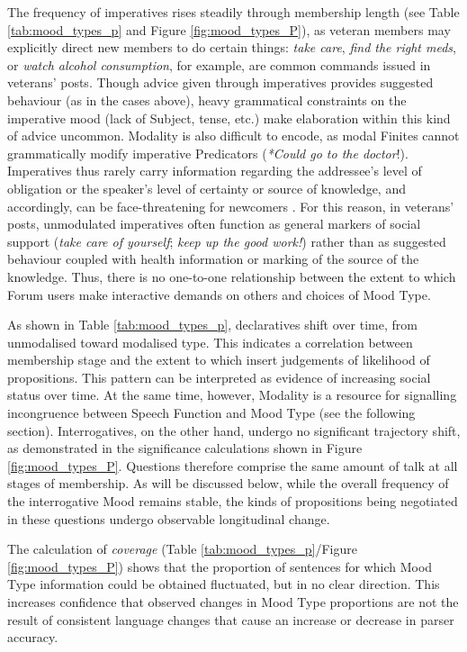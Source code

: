 The frequency of imperatives rises steadily through membership length (see Table \ref{tab:mood_types_p} and Figure \ref{fig:mood_types_P}), as veteran \glspl{member} may explicitly direct new \glspl{member} to do certain things: \emph{take care}, \emph{find the right meds}, or \emph{watch alcohol consumption}, for example, are common commands issued in veterans' \glspl{post}. Though advice given through imperatives provides suggested behaviour (as in the cases above), heavy grammatical constraints on the imperative mood (lack of Subject, tense, etc.) make elaboration within this kind of advice uncommon. Modality is also difficult to encode, as modal Finites cannot grammatically modify imperative Predicators (\emph{*Could go to the doctor}!). Imperatives thus rarely carry information regarding the addressee's level of obligation or the speaker's level of certainty or source of knowledge, and accordingly, can be face\hyp{}threatening for newcomers \cite{goldsmith2004communicating,hudson1990discourse}. For this reason, in veterans' \glspl{post}, unmodulated imperatives often function as general markers of social support (\emph{take care of yourself}; \emph{keep up the good work!}) rather than as suggested behaviour coupled with health information or marking of the source of the knowledge. Thus, there is no one-to-one relationship between the extent to which \gls{Forum} users make interactive demands on others and choices of Mood Type.

As shown in Table \ref{tab:mood_types_p}, declaratives shift over time, from unmodalised toward modalised type. This indicates a correlation between membership stage and the extent to which  insert judgements of likelihood of propositions. This pattern can be interpreted as evidence of increasing social status over time. At the same time, however, Modality is a resource for signalling incongruence between Speech Function and Mood Type (see the following section). Interrogatives, on the other hand, undergo no significant trajectory shift, as demonstrated in the significance calculations shown in Figure \ref{fig:mood_types_P}. Questions therefore comprise the same amount of talk at all stages of membership. As will be discussed below, while the overall frequency of the interrogative Mood remains stable, the kinds of propositions being negotiated in these questions undergo observable longitudinal change.

The calculation of \emph{coverage} (Table \ref{tab:mood_types_p}\slash Figure \ref{fig:mood_types_P}) shows that the proportion of sentences for which Mood Type information could be obtained fluctuated, but in no clear direction. This increases confidence that observed changes in Mood Type proportions are not the result of consistent language changes that cause an increase or decrease in parser accuracy.

